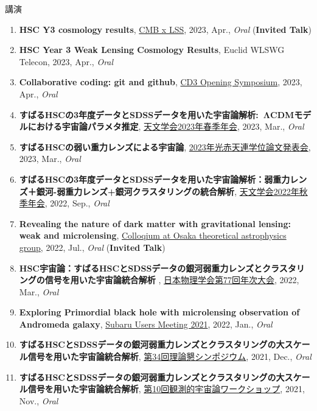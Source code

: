\begin{rSection}{講演}
\begin{enumerate}
\item \textbf{HSC Y3 cosmology results}, \href{https://www2.yukawa.kyoto-u.ac.jp/~cmb-lss/index.php}{CMB x LSS}, 2023, Apr., \textit{Oral} (\textbf{Invited Talk})
\item \textbf{HSC Year 3 Weak Lensing Cosmology Results}, Euclid WLSWG Telecon, 2023, Apr., \textit{Oral}
\item \textbf{Collaborative coding: git and github}, \href{https://cd3.ipmu.jp/opening/}{CD3 Opening Symposium}, 2023, Apr., \textit{Oral}
\item \textbf{すばるHSCの3年度データとSDSSデータを用いた宇宙論解析: ΛCDMモデルにおける宇宙論パラメタ推定}, \href{https://www.asj.or.jp/nenkai/archive/2023a/pdf/U20a.pdf}{天文学会2023年春季年会}, 2023, Mar., \textit{Oral}
\item \textbf{すばるHSCの弱い重力レンズによる宇宙論}, \href{http://gopira.jp/Dthesis2022/program.html}{2023年光赤天連学位論文発表会}, 2023, Mar., \textit{Oral}
\item \textbf{すばるHSCの3年度データとSDSSデータを用いた宇宙論解析：弱重力レンズ＋銀河-弱重力レンズ+銀河クラスタリングの統合解析}, \href{https://www.asj.or.jp/nenkai/archive/2022b/pdf/U15a.pdf}{天文学会2022年秋季年会}, 2022, Sep., \textit{Oral}
\item \textbf{Revealing the nature of dark matter with gravitational lensing: weak and microlensing}, \href{http://astro-osaka.jp/OUTAP/colloquium-abstracts.html#sugiyama}{Colloqium at Osaka theoretical astrophysics group}, 2022, Jul., \textit{Oral} (\textbf{Invited Talk})
\item \textbf{HSC宇宙論：すばるHSCとSDSSデータの銀河弱重力レンズとクラスタリングの信号を用いた宇宙論統合解析 }, \href{https://www.jps.or.jp/activities/meetings/annual/annual-index.php}{日本物理学会第77回年次大会}, 2022, Mar., \textit{Oral}
\item \textbf{Exploring Primordial black hole with microlensing observation of Andromeda galaxy}, \href{https://subarutelescope.org/Science/SubaruUM/SubaruUM2021/}{Subaru Users Meeting 2021}, 2022, Jan., \textit{Oral}
\item \textbf{すばるHSCとSDSSデータの銀河弱重力レンズとクラスタリングの大スケール信号を用いた宇宙論統合解析}, \href{https://sites.google.com/view/rironkon2021/}{第34回理論懇シンポジウム}, 2021, Dec., \textit{Oral}
\item \textbf{すばるHSCとSDSSデータの銀河弱重力レンズとクラスタリングの大スケール信号を用いた宇宙論統合解析}, \href{https://sites.google.com/view/obscosmws2021main}{第10回観測的宇宙論ワークショップ}, 2021, Nov., \textit{Oral}

\end{enumerate}
\end{rSection}
